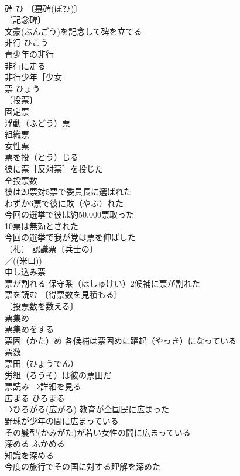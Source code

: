 \documentclass[8pt]{extreport}
\begin{document}
\begin{CJK}{UTF8}{min}
\\	碑	ひ	〔墓碑(ぼひ)〕
\\	〔記念碑〕
\\	文豪(ぶんごう)を記念して碑を立てる 
\\	非行	ひこう	
\\	青少年の非行 
\\	非行に走る 
\\	非行少年［少女］ 
\\	票	ひょう	
\\	〔投票〕
\\	固定票 
\\	浮動（ふどう）票 
\\	組織票 
\\	女性票 
\\	票を投（とう）じる 
\\	彼に票［反対票］を投じた 
\\	全投票数 
\\	彼は20票対5票で委員長に選ばれた 
\\	わずか6票で彼に敗（やぶ）れた 
\\	今回の選挙で彼は約50,000票取った 
\\	10票は無効とされた 
\\	今回の選挙で我が党は票を伸ばした 
\\	〔札〕 認識票〔兵士の〕 
\\	／((米口))
\\	申し込み票 
\\	票が割れる 保守系（ほしゅけい）2候補に票が割れた 
\\	票を読む 〔得票数を見積もる〕
\\	〔投票数を数える〕
\\	票集め 
\\	票集めをする 
\\	票固（かた）め 各候補は票固めに躍起（やっき）になっている 
\\	票数 
\\	票田（ひょうでん） 
\\	労組（ろうそ）は彼の票田だ 
\\	票読み ⇒詳細を見る
\\	広まる	ひろまる	
\\	⇒ひろがる(広がる) 教育が全国民に広まった 
\\	野球が少年の間に広まっている 
\\	その髪型(かみがた)が若い女性の間に広まっている 
\\	深める	ふかめる	
\\	知識を深める 
\\	今度の旅行でその国に対する理解を深めた 

\end{CJK}
\end{document}
